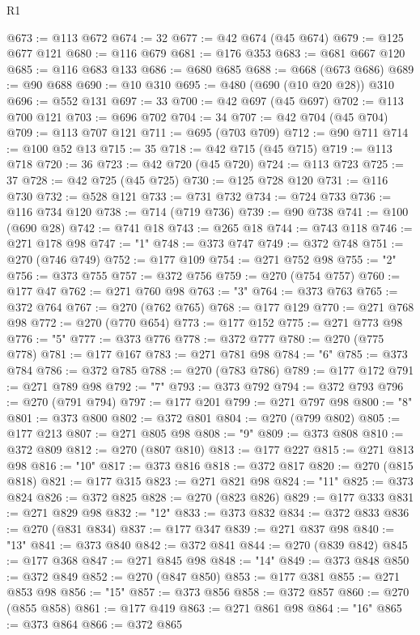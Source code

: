 \begin{lexlean}{R1}
\begin{coremodule}
@673 := @113 @672
@674 := 32
@677 := @42 @674 (@45 @674)
@679 := @125 @677 @121
@680 := @116 @679
@681 := @176 @353
@683 := @681 @667 @120
@685 := @116 @683 @133
@686 := @680 @685
@688 := @668 (@673 @686)
@689 := @90 @688
@690 := @10 @310
@695 := @480 (@690 (@10 @20 @28)) @310
@696 := @552 @131
@697 := 33
@700 := @42 @697 (@45 @697)
@702 := @113 @700 @121
@703 := @696 @702
@704 := 34
@707 := @42 @704 (@45 @704)
@709 := @113 @707 @121
@711 := @695 (@703 @709)
@712 := @90 @711
@714 := @100 @52 @13
@715 := 35
@718 := @42 @715 (@45 @715)
@719 := @113 @718
@720 := 36
@723 := @42 @720 (@45 @720)
@724 := @113 @723
@725 := 37
@728 := @42 @725 (@45 @725)
@730 := @125 @728 @120
@731 := @116 @730
@732 := @528 @121
@733 := @731 @732
@734 := @724 @733
@736 := @116 @734 @120
@738 := @714 (@719 @736)
@739 := @90 @738
@741 := @100 (@690 @28)
@742 := @741 @18
@743 := @265 @18
@744 := @743 @118
@746 := @271 @178 @98
@747 := "1"
@748 := @373 @747
@749 := @372 @748
@751 := @270 (@746 @749)
@752 := @177 @109
@754 := @271 @752 @98
@755 := "2"
@756 := @373 @755
@757 := @372 @756
@759 := @270 (@754 @757)
@760 := @177 @47
@762 := @271 @760 @98
@763 := "3"
@764 := @373 @763
@765 := @372 @764
@767 := @270 (@762 @765)
@768 := @177 @129
@770 := @271 @768 @98
@772 := @270 (@770 @654)
@773 := @177 @152
@775 := @271 @773 @98
@776 := "5"
@777 := @373 @776
@778 := @372 @777
@780 := @270 (@775 @778)
@781 := @177 @167
@783 := @271 @781 @98
@784 := "6"
@785 := @373 @784
@786 := @372 @785
@788 := @270 (@783 @786)
@789 := @177 @172
@791 := @271 @789 @98
@792 := "7"
@793 := @373 @792
@794 := @372 @793
@796 := @270 (@791 @794)
@797 := @177 @201
@799 := @271 @797 @98
@800 := "8"
@801 := @373 @800
@802 := @372 @801
@804 := @270 (@799 @802)
@805 := @177 @213
@807 := @271 @805 @98
@808 := "9"
@809 := @373 @808
@810 := @372 @809
@812 := @270 (@807 @810)
@813 := @177 @227
@815 := @271 @813 @98
@816 := "10"
@817 := @373 @816
@818 := @372 @817
@820 := @270 (@815 @818)
@821 := @177 @315
@823 := @271 @821 @98
@824 := "11"
@825 := @373 @824
@826 := @372 @825
@828 := @270 (@823 @826)
@829 := @177 @333
@831 := @271 @829 @98
@832 := "12"
@833 := @373 @832
@834 := @372 @833
@836 := @270 (@831 @834)
@837 := @177 @347
@839 := @271 @837 @98
@840 := "13"
@841 := @373 @840
@842 := @372 @841
@844 := @270 (@839 @842)
@845 := @177 @368
@847 := @271 @845 @98
@848 := "14"
@849 := @373 @848
@850 := @372 @849
@852 := @270 (@847 @850)
@853 := @177 @381
@855 := @271 @853 @98
@856 := "15"
@857 := @373 @856
@858 := @372 @857
@860 := @270 (@855 @858)
@861 := @177 @419
@863 := @271 @861 @98
@864 := "16"
@865 := @373 @864
@866 := @372 @865

\end{coremodule}
\end{lexlean}
